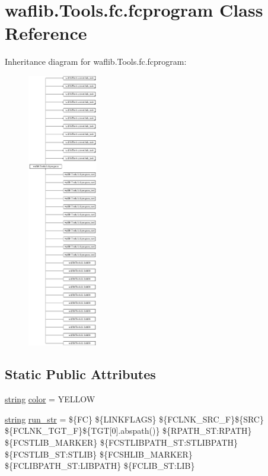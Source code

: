 \hypertarget{classwaflib_1_1_tools_1_1fc_1_1fcprogram}{}\section{waflib.\+Tools.\+fc.\+fcprogram Class Reference}
\label{classwaflib_1_1_tools_1_1fc_1_1fcprogram}
Inheritance diagram for waflib.\+Tools.\+fc.\+fcprogram\+:\begin{figure}[H]
\begin{center}
\leavevmode
\includegraphics[height=12.000000cm]{classwaflib_1_1_tools_1_1fc_1_1fcprogram}
\end{center}
\end{figure}
\subsection*{Static Public Attributes}
\begin{DoxyCompactItemize}
\item 
\hyperlink{test__lib_f_l_a_c_2format_8c_ab02026ad0de9fb6c1b4233deb0a00c75}{string} \hyperlink{classwaflib_1_1_tools_1_1fc_1_1fcprogram_a71f28eb40e0c19ec05d8f1899a66ed93}{color} = \textquotesingle{}Y\+E\+L\+L\+OW\textquotesingle{}
\item 
\hyperlink{test__lib_f_l_a_c_2format_8c_ab02026ad0de9fb6c1b4233deb0a00c75}{string} \hyperlink{classwaflib_1_1_tools_1_1fc_1_1fcprogram_ab52d4d1babe16531a4097da0935a79ab}{run\+\_\+str} = \textquotesingle{}\$\{FC\} \$\{L\+I\+N\+K\+F\+L\+A\+GS\} \$\{F\+C\+L\+N\+K\+\_\+\+S\+R\+C\+\_\+F\}\$\{S\+RC\} \$\{F\+C\+L\+N\+K\+\_\+\+T\+G\+T\+\_\+F\}\$\{T\+GT\mbox{[}0\mbox{]}.abspath()\} \$\{R\+P\+A\+T\+H\+\_\+\+S\+T\+:\+R\+P\+A\+TH\} \$\{F\+C\+S\+T\+L\+I\+B\+\_\+\+M\+A\+R\+K\+ER\} \$\{F\+C\+S\+T\+L\+I\+B\+P\+A\+T\+H\+\_\+\+S\+T\+:\+S\+T\+L\+I\+B\+P\+A\+TH\} \$\{F\+C\+S\+T\+L\+I\+B\+\_\+\+S\+T\+:\+S\+T\+L\+IB\} \$\{F\+C\+S\+H\+L\+I\+B\+\_\+\+M\+A\+R\+K\+ER\} \$\{F\+C\+L\+I\+B\+P\+A\+T\+H\+\_\+\+S\+T\+:\+L\+I\+B\+P\+A\+TH\} \$\{F\+C\+L\+I\+B\+\_\+\+S\+T\+:\+L\+IB\}\textquotesingle{}
\end{DoxyCompactItemize}

